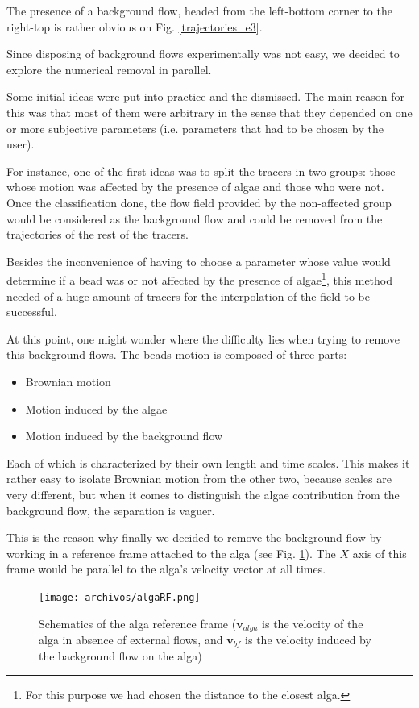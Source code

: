 The presence of a background flow, headed from the left-bottom corner to the right-top  is rather obvious on Fig. \ref{trajectories_e3}. 

Since disposing of background flows experimentally was not easy, we decided to explore the numerical removal in parallel.

Some initial ideas were put into practice and the dismissed. The main reason for this was that most of them were arbitrary in the sense that they depended on one or more subjective parameters (i.e. parameters that had to be chosen by the user). 

For instance, one of the first ideas was to split the tracers in two groups: those whose motion was affected by the presence of algae and those who were not. Once the classification done, the flow field provided by the non-affected group would be considered as the background flow and could be removed from the trajectories of the rest of the tracers.

Besides the inconvenience of having to choose a parameter whose value would determine if a bead was or not affected by the presence of algae\footnote{For this purpose we had chosen the distance to the closest alga.}, this method needed of a huge amount of tracers for the interpolation of the field to be successful. 

At this point, one might wonder where the difficulty lies when trying to remove this background flows. The beads motion is composed of three parts:

\begin{itemize}
	\item Brownian motion
	\item Motion induced by the algae 
	\item Motion induced by the background flow
\end{itemize}

Each of which is characterized by their own length and time scales. This makes it rather easy to isolate Brownian motion from the other two, because scales are very different, but when it comes to distinguish the algae contribution from the background flow, the separation is vaguer.

This is the reason why finally we decided to remove the background flow by working in a reference frame attached to the alga (see Fig. \ref{alga_RF}). The $X$ axis of this frame would be parallel to the alga's velocity vector at all times.

\begin{figure}[H]
	\centering
	\texttt{[image: archivos/algaRF.png]}
	\caption{Schematics of the alga reference frame ($\mathbf{v}_{alga}$ is the velocity of the alga in absence of external flows, and $\mathbf{v}_{bf}$ is the velocity induced by the background flow on the alga)}
	\label{alga_RF}
\end{figure}

